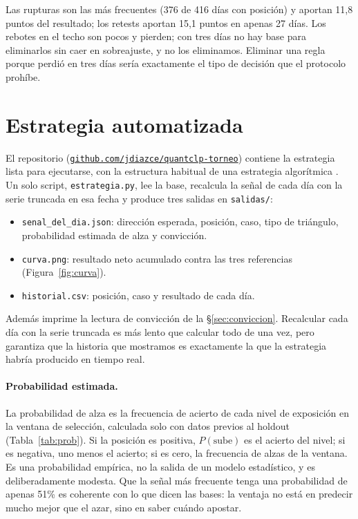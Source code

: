 \documentclass[10pt,a4paper]{article}
\begin{document}
Las rupturas son las más frecuentes (376 de 416 días con posición) y aportan 11,8
puntos del resultado; los retests aportan 15,1 puntos en apenas 27 días. Los
rebotes en el techo son pocos y pierden; con tres días no hay base para
eliminarlos sin caer en sobreajuste, y no los eliminamos. Eliminar una regla porque
perdió en tres días sería exactamente el tipo de decisión que el protocolo prohíbe.

\section{Estrategia automatizada}\label{sec:auto}

El repositorio
(\href{https://github.com/jdiazce/quantclp-torneo}{\texttt{github.com/jdiazce/quantclp-torneo}})
contiene la estrategia lista para ejecutarse, con la estructura habitual de una
estrategia algorítmica \citep{hilpisch2020}. Un solo script, \texttt{estrategia.py},
lee la base, recalcula la señal de cada día con la serie truncada en esa fecha y
produce tres salidas en \texttt{salidas/}:
\begin{itemize}
  \item \texttt{senal\_del\_dia.json}: dirección esperada, posición, caso, tipo de
        triángulo, probabilidad estimada de alza y convicción.
  \item \texttt{curva.png}: resultado neto acumulado contra las tres referencias
        (Figura~\ref{fig:curva}).
  \item \texttt{historial.csv}: posición, caso y resultado de cada día.
\end{itemize}
Además imprime la lectura de convicción de la §\ref{sec:conviccion}. Recalcular
cada día con la serie truncada es más lento que calcular todo de una vez, pero
garantiza que la historia que mostramos es exactamente la que la estrategia habría
producido en tiempo real.

\paragraph{Probabilidad estimada.} La probabilidad de alza es la frecuencia de
acierto de cada nivel de exposición en la ventana de selección, calculada solo con
datos previos al holdout (Tabla~\ref{tab:prob}). Si la posición es positiva,
$P(\text{sube})$ es el acierto del nivel; si es negativa, uno menos el acierto; si
es cero, la frecuencia de alzas de la ventana. Es una probabilidad empírica, no la
salida de un modelo estadístico, y es deliberadamente modesta. Que la señal más
frecuente tenga una probabilidad de apenas 51\% es coherente con lo que dicen las
bases: la ventaja no está en predecir mucho mejor que el azar, sino en saber cuándo
apostar.
\end{document}
